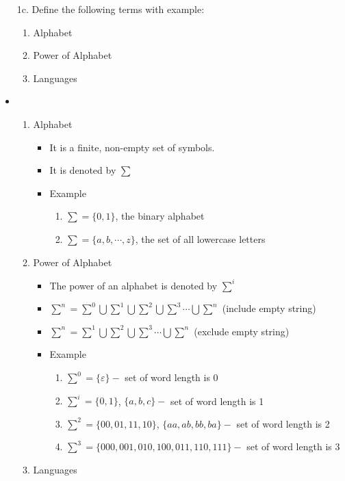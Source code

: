 \documentclass{article}
\def \answer{\item [$\rightarrow$]}
\begin{document}
\begin{itemize}
		\item [1c.] Define the following terms with example:
			\begin{enumerate}[label=\roman*)]
				\item Alphabet
				\item Power of Alphabet
				\item Languages
			\end{enumerate}
		\answer
			\begin{enumerate}[label=\roman*)]
				\item Alphabet
					\begin{itemize}
						\item It is a finite, non-empty set of symbols.
						\item It is denoted by $\sum$
						\item Example
							\begin{enumerate}[label=\alph*)]
								\item $\sum=\{0,1\}$, the binary alphabet
								\item $\sum=\{a,b,\cdots,z\}$, the set of all lowercase letters
							\end{enumerate}
					\end{itemize}
				\item Power of Alphabet
					\begin{itemize}
						\item The power of an alphabet is denoted by $\sum^i$
						\item $\sum^n=\sum^0\bigcup\sum^1\bigcup\sum^2\bigcup\sum^3\cdots\bigcup\sum^n$
							(include empty string)
						\item $\sum^n=\sum^1\bigcup\sum^2\bigcup\sum^3\cdots\bigcup\sum^n$
							(exclude empty string)
						\item Example
							\begin{enumerate}[label=\alph*)]
								\item $\sum^0=\{\varepsilon\}-$ set of word length is 0
								\item $\sum^i=\{0,1\}$, $\{a,b,c\}-$ set of word length is 1
								\item $\sum^2=\{00,01,11,10\}$, $\{aa,ab,bb,ba\}-$ set of word length is 2
								\item $\sum^3=\{000,001,010,100,011,110,111\}-$ set of word length is 3
							\end{enumerate}
					\end{itemize}
				\item Languages
					\begin{itemize}

\end{itemize}
\end{enumerate}
\end{itemize}
\end{document}

